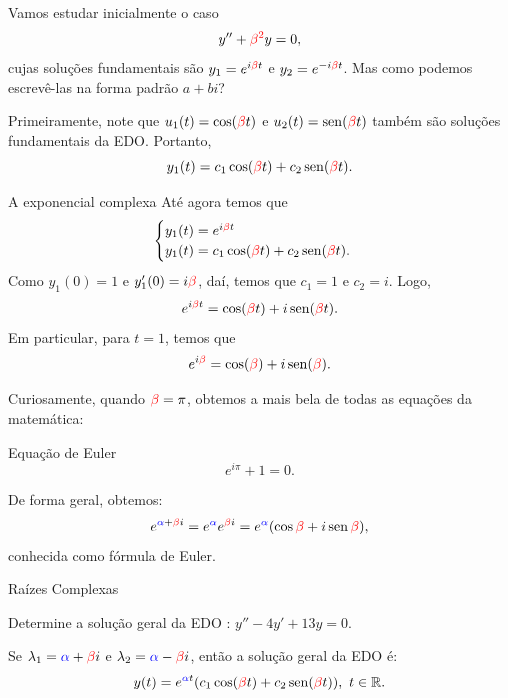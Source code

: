 \begin{frame}
Vamos estudar inicialmente o caso
\[y''+{\color{red}\beta^2}y=0,\]
cujas soluções fundamentais são $y_1=e^{i{\color{red} \beta}t}$ e $y_2=e^{-i{\color{red} \beta}t}$. Mas como podemos escrevê-las na forma padrão  $a+bi$?
\medskip

Primeiramente, note que $u_1(t)=\cos( {\color{red} \beta}t)$ e $u_2(t)=\operatorname{sen}( {\color{red} \beta}t)$ também são soluções fundamentais da EDO. Portanto, 
\[y_1(t)=c_1\cos( {\color{red} \beta}t)+c_2\operatorname{sen}( {\color{red} \beta}t).\]
\end{frame}

\begin{frame}{A exponencial complexa}
Até agora temos que
\[\begin{cases}
y_1(t)=e^{i{\color{red} \beta}t}\\
y_1(t)=c_1\cos( {\color{red} \beta}t)+c_2\operatorname{sen}( {\color{red} \beta}t).
\end{cases}\]
Como $y_1(0)=1$ e $y_1'(0)=i{\color{red} \beta}$, daí, temos que $c_1=1$ e $c_2=i$. Logo,
\[e^{i{\color{red} \beta}t}=\cos( {\color{red} \beta}t)+i\operatorname{sen}( {\color{red} \beta}t).\]
Em particular, para $t=1$, temos que 
\[e^{i{\color{red} \beta}}=\cos( {\color{red} \beta})+i\operatorname{sen}( {\color{red} \beta}).\]



\end{frame}


\begin{frame}
Curiosamente, quando  ${\color{red} \beta}=\pi$, obtemos {\color {red} a mais bela de todas as equações da matemática}:
\begin{block}{Equação de Euler}
\[e^{i\pi}+1=0.\]
\end{block}



De forma geral, obtemos:
\[e^{{\color{blue}\alpha}+{\color{red} \beta} i}=e^{\color{blue}\alpha} e^{{\color{red} \beta} i}=e^{\color{blue}\alpha}(\cos {\color{red} \beta} +i\operatorname{sen} {\color{red} \beta}),\]
conhecida como fórmula de Euler.
\end{frame}


\begin{frame}{Raízes Complexas}
\begin{exe}
Determine a solução geral da EDO : $y''-4y'+13y=0$.
\end{exe}
\begin{block}{ }
Se $\lambda_1={\color{blue}\alpha}+{\color{red} \beta} i$ e $\lambda_2={\color{blue}\alpha}-{\color{red} \beta} i$, então a solução geral da EDO é:
\[y(t)=e^{{\color{blue}\alpha} t}(c_1\cos({\color{red} \beta} t)+c_2\operatorname{sen}({\color{red} \beta} t)),\ t\in \mathbb{R}.\]
\end{block}
\end{frame}


